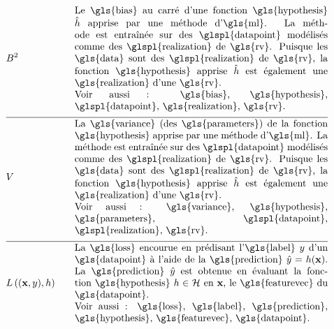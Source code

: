 \begin{align}
	& \biasterm^2 & \quad & \parbox{.75\textwidth}{
	Le \gls{bias} au carré d’une fonction \gls{hypothesis} $\learnthypothesis$ apprise par une méthode d’\gls{ml}. La méthode est entraînée sur des \glspl{datapoint} modélisés comme des \glspl{realization} de \gls{rv}. Puisque les \gls{data} sont des \glspl{realization} de \gls{rv}, la fonction \gls{hypothesis} apprise $\learnthypothesis$ est également une \gls{realization} d’une \gls{rv}. \\ Voir aussi : \gls{bias}, \gls{hypothesis}, \glspl{datapoint}, \gls{realization}, \gls{rv}.} \nonumber \\[2mm] \hline \nonumber\\[-5mm]
	& \varianceterm & \quad & \parbox{.75\textwidth}{La \gls{variance} (des \gls{parameters}) de la fonction \gls{hypothesis} apprise par une méthode d’\gls{ml}. La méthode est entraînée sur des \glspl{datapoint} modélisés comme des \glspl{realization} de \gls{rv}. Puisque les \gls{data} sont des \glspl{realization} de \gls{rv}, la fonction \gls{hypothesis} apprise $\learnthypothesis$ est également une \gls{realization} d’une \gls{rv}. \\ Voir aussi : \gls{variance}, \gls{hypothesis}, \gls{parameters}, \glspl{datapoint}, \glspl{realization}, \gls{rv}.} \nonumber \\[2mm] \hline \nonumber\\[-5mm]
	& \lossfunc{(\featurevec,\truelabel)}{\hypothesis} & \quad & \parbox{.75\textwidth}{La \gls{loss} encourue en prédisant l'\gls{label} $\truelabel$ d’un \gls{datapoint} à l’aide de la \gls{prediction} $\hat{\truelabel}=h(\featurevec)$. La \gls{prediction} $\hat{\truelabel}$ est obtenue en évaluant la fonction \gls{hypothesis} $\hypothesis \in \hypospace$ en $\featurevec$, le \gls{featurevec} du \gls{datapoint}. \\ Voir aussi : \gls{loss}, \gls{label}, \gls{prediction}, \gls{hypothesis}, \gls{featurevec}, \gls{datapoint}.} \nonumber
\end{align}

